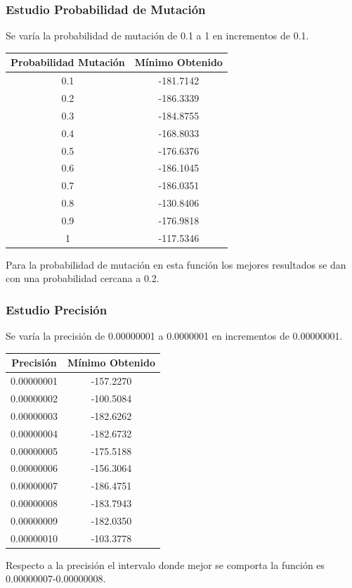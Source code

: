 \documentclass[12pt]{article}
\begin{document}
\subsubsection*{Estudio Probabilidad de Mutación}
	Se varía la probabilidad de mutación de 0.1 a 1 en incrementos de 0.1.
\begin{table}[H]
\begin{center}
\begin{tabular}{|cc|} \hline
Probabilidad Mutación & Mínimo Obtenido \\  \hline
0.1 & -181.7142 \\ 
0.2 & -186.3339 \\ 
0.3 & -184.8755 \\
0.4 & -168.8033 \\
0.5 & -176.6376 \\
0.6 & -186.1045 \\
0.7 & -186.0351 \\
0.8 & -130.8406 \\ 
0.9 & -176.9818 \\
1   & -117.5346 \\  \hline
\end{tabular}
\end{center}
\end{table}
	Para la probabilidad de mutación en esta función los mejores resultados se dan con una probabilidad cercana a 0.2.

\subsubsection*{Estudio Precisión}
	Se varía la precisión de 0.00000001 a 0.0000001 en incrementos de 0.00000001.
\begin{table}[H]
\begin{center}
\begin{tabular}{|cc|} \hline
Precisión & Mínimo Obtenido \\  \hline
0.00000001 & -157.2270 \\ 
0.00000002 & -100.5084 \\ 
0.00000003 & -182.6262 \\
0.00000004 & -182.6732 \\
0.00000005 & -175.5188 \\
0.00000006 & -156.3064 \\
0.00000007 & -186.4751 \\
0.00000008 & -183.7943 \\ 
0.00000009 & -182.0350 \\
0.00000010 & -103.3778 \\  \hline
\end{tabular}
\end{center}
\end{table}
	Respecto a la precisión el intervalo donde mejor se comporta la función es 0.00000007-0.00000008.
\end{document}
